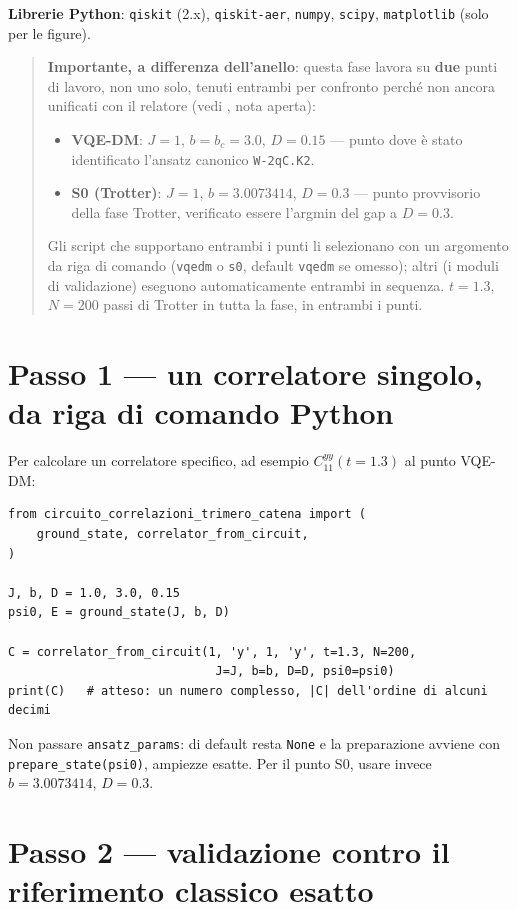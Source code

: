 \documentclass[11pt,a4paper]{article}
\begin{document}
\textbf{Librerie Python}: \texttt{qiskit} (2.x), \texttt{qiskit-aer}, \texttt{numpy},
\texttt{scipy}, \texttt{matplotlib} (solo per le figure).

\begin{quote}
\textbf{Importante, a differenza dell'anello}: questa fase lavora su \textbf{due} punti di
lavoro, non uno solo, tenuti entrambi per confronto perché non ancora unificati con il
relatore (vedi \texttt{}, nota aperta):
\begin{itemize}
\item \textbf{VQE-DM}: $J=1$, $b=b_c=3.0$, $D=0.15$ --- punto dove è stato identificato
l'ansatz canonico \texttt{W-2qC.K2}.
\item \textbf{S0 (Trotter)}: $J=1$, $b=3.0073414$, $D=0.3$ --- punto provvisorio della fase
Trotter, verificato essere l'argmin del gap a $D=0.3$.
\end{itemize}
Gli script che supportano entrambi i punti li selezionano con un argomento da riga di comando
(\texttt{vqedm} o \texttt{s0}, default \texttt{vqedm} se omesso); altri (i moduli di
validazione) eseguono automaticamente entrambi in sequenza. $t=1.3$, $N=200$ passi di Trotter
in tutta la fase, in entrambi i punti.
\end{quote}

\section*{Passo 1 --- un correlatore singolo, da riga di comando Python}

Per calcolare un correlatore specifico, ad esempio $C_{11}^{yy}(t{=}1.3)$ al punto VQE-DM:
\begin{verbatim}
from circuito_correlazioni_trimero_catena import (
    ground_state, correlator_from_circuit,
)

J, b, D = 1.0, 3.0, 0.15
psi0, E = ground_state(J, b, D)

C = correlator_from_circuit(1, 'y', 1, 'y', t=1.3, N=200,
                             J=J, b=b, D=D, psi0=psi0)
print(C)   # atteso: un numero complesso, |C| dell'ordine di alcuni decimi
\end{verbatim}
Non passare \texttt{ansatz\_params}: di default resta \texttt{None} e la preparazione avviene
con \texttt{prepare\_state(psi0)}, ampiezze esatte. Per il punto S0, usare invece
$b{=}3.0073414$, $D{=}0.3$.

\section*{Passo 2 --- validazione contro il riferimento classico esatto}
\end{document}
